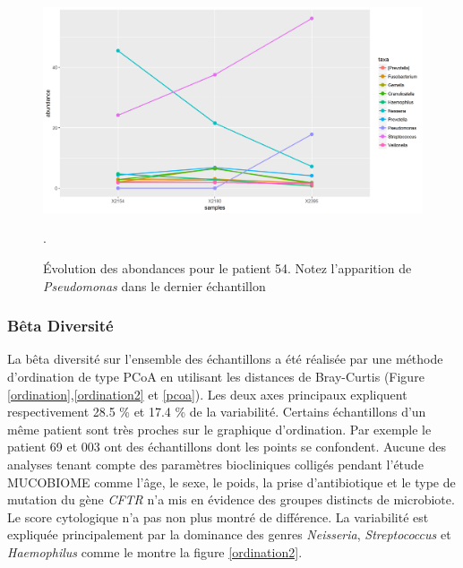 \documentclass[12pt,a4paper]{article}
\begin{document}
\begin{figure}
\begin{center}
\includegraphics[scale=0.60]{img/curve_054.png}\hfill
\end{center}
\caption{Évolution des abondances pour le patient 54. Notez l'apparition de \textit{Pseudomonas} dans le dernier échantillon}.
\label{evolution54}
\end{figure}

\subsubsection{Bêta Diversité}
La bêta diversité sur l’ensemble des échantillons a été réalisée par une méthode d’ordination de type PCoA en utilisant les distances de Bray-Curtis (Figure \ref{ordination},\ref{ordination2} et \ref{pcoa}).
Les deux axes principaux expliquent respectivement 28.5 \% et 17.4 \% de la variabilité.
Certains échantillons d’un même patient sont très proches sur le graphique d’ordination. Par exemple le patient 69 et 003 ont des échantillons dont les points se confondent.
Aucune des analyses tenant compte des paramètres biocliniques colligés pendant l'étude MUCOBIOME comme l'âge, le sexe, le poids, la prise d'antibiotique et le type de mutation du gène \textit{CFTR} n’a mis en évidence des groupes distincts de microbiote. Le score cytologique n'a pas non plus montré de différence.
La variabilité est expliquée principalement par la dominance des genres \textit{Neisseria}, \textit{Streptococcus} et \textit{Haemophilus} comme le montre la figure \ref{ordination2}.
\end{document}
